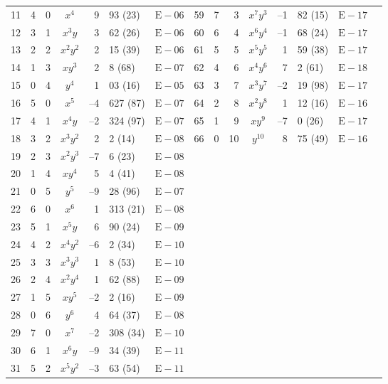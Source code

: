 \begin{table}[htbp]
\begin{center}
\begin{tabular}{rrrcr@{.}lc|rrrcr@{.}lcr}
11 & 4 & 0 & $x^{4}$ & 9 & 93 (23) & $ \mathrm{E}-06 $        & 59 & 7 & 3 & $x^{7}y^{3}$ & --1 & 82 (15) & $ \mathrm{E}-17 $ \\
12 & 3 & 1 & $x^{3}y$ & 3 & 62 (26) & $ \mathrm{E}-06 $       & 60 & 6 & 4 & $x^{6}y^{4}$ & --1 & 68 (24) & $ \mathrm{E}-17 $ \\
13 & 2 & 2 & $x^{2}y^{2}$ & 2 & 15 (39) & $ \mathrm{E}-06 $   & 61 & 5 & 5 & $x^{5}y^{5}$ & 1 & 59 (38) & $ \mathrm{E}-17 $ \\
14 & 1 & 3 & $xy^{3}$ & 2 & 8 (68) & $ \mathrm{E}-07 $        & 62 & 4 & 6 & $x^{4}y^{6}$ & 7 & 2 (61) & $ \mathrm{E}-18 $ \\
15 & 0 & 4 & $y^{4}$ & 1 & 03 (16) & $ \mathrm{E}-05 $        & 63 & 3 & 7 & $x^{3}y^{7}$ & --2 & 19 (98) & $ \mathrm{E}-17 $ \\
16 & 5 & 0 & $x^{5}$ & --4 & 627 (87) & $ \mathrm{E}-07 $     & 64 & 2 & 8 & $x^{2}y^{8}$ & 1 & 12 (16) & $ \mathrm{E}-16 $ \\
17 & 4 & 1 & $x^{4}y$ & --2 & 324 (97) & $ \mathrm{E}-07 $    & 65 & 1 & 9 & $xy^{9}$ & --7 & 0 (26) & $ \mathrm{E}-17 $ \\
18 & 3 & 2 & $x^{3}y^{2}$ & 2 & 2 (14) & $ \mathrm{E}-08 $    & 66 & 0 & 10 & $y^{10}$ & 8 & 75 (49) & $ \mathrm{E}-16 $ \\
19 & 2 & 3 & $x^{2}y^{3}$ & --7 & 6 (23) & $ \mathrm{E}-08 $ \\
20 & 1 & 4 & $xy^{4}$ & 5 & 4 (41) & $ \mathrm{E}-08 $ \\
21 & 0 & 5 & $y^{5}$ & --9 & 28 (96) & $ \mathrm{E}-07 $ \\[5pt]
22 & 6 & 0 & $x^{6}$ & 1 & 313 (21) & $ \mathrm{E}-08 $ \\
23 & 5 & 1 & $x^{5}y$ & 6 & 90 (24) & $ \mathrm{E}-09 $ \\
24 & 4 & 2 & $x^{4}y^{2}$ & --6 & 2 (34) & $ \mathrm{E}-10 $ \\
25 & 3 & 3 & $x^{3}y^{3}$ & 1 & 8 (53) & $ \mathrm{E}-10 $ \\
26 & 2 & 4 & $x^{2}y^{4}$ & 1 & 62 (88) & $ \mathrm{E}-09 $ \\
27 & 1 & 5 & $xy^{5}$ & --2 & 2 (16) & $ \mathrm{E}-09 $ \\
28 & 0 & 6 & $y^{6}$ & 4 & 64 (37) & $ \mathrm{E}-08 $ \\[5pt]
29 & 7 & 0 & $x^{7}$ & --2 & 308 (34) & $ \mathrm{E}-10 $ \\
30 & 6 & 1 & $x^{6}y$ & --9 & 34 (39) & $ \mathrm{E}-11 $ \\
31 & 5 & 2 & $x^{5}y^{2}$ & --3 & 63 (54) & $ \mathrm{E}-11 $ \\

\end{tabular}
\end{center}
\end{table}
